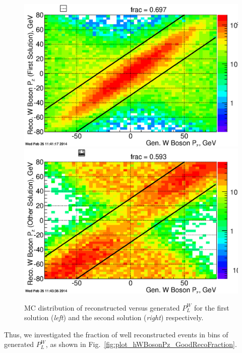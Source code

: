 \documentclass[12pt]{article}
\begin{document}
\begin{figure}[htbp]
\begin{center}
\includegraphics[scale=0.4]{images/P_long_study/hRecoVsWBosonPz_FirstSol}
\includegraphics[scale=0.4]{images/P_long_study/hRecoVsWBosonPz_OtherSol}
\end{center}
\caption{MC distribution of reconstructed versus generated $P^{W}_{L}$ for the first solution ({\it left}) and the second solution ({\it right}) respectively.}
\label{fig:plot_hRecoVsWBosonPz} 
\end{figure} 
Thus, we investigated the fraction of well reconstructed events in bins of  generated $P^{W}_{L}$, as shown in Fig.~\ref{fig:plot_hWBosonPz_GoodRecoFraction}.
 
\end{document}
